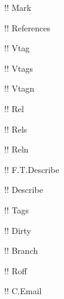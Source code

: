 \documentclass[10pt,a4paper,article,showtrims]{memoir}
\begin{document}
\ttfamily
!\gitMark! Mark

!\gitReferences ! References

!\gitVtag ! Vtag

!\gitVtags ! Vtags

!\gitVtagn ! Vtagn

!\gitRel ! Rel

!\gitRels ! Rels

!\gitReln ! Reln

!\gitFirstTagDescribe ! F.T.Describe

!\gitDescribe ! Describe

!\gitTags ! Tags

!\gitDirty ! Dirty

!\gitBranch ! Branch

!\gitRoff ! Roff

!\gitCommitterEmail! C.Email
\end{document}
